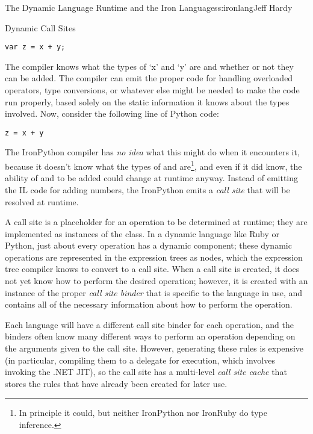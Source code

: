 \begin{aosachapter}{The Dynamic Language Runtime and the Iron Languages}{s:ironlang}{Jeff Hardy}
\begin{aosasect1}{Dynamic Call Sites}
\begin{verbatim}
var z = x + y;
\end{verbatim}

\noindent The compiler knows what the types of `x' and `y' are and whether or not they
can be added. The compiler can emit the proper code for handling overloaded
operators, type conversions, or whatever else might be needed to make the code
run properly, based solely on the static information it knows about the types
involved. Now, consider the following line of Python code:

\begin{verbatim}
z = x + y
\end{verbatim}

The IronPython compiler has \emph{no idea} what this might do when it
encounters it, because it doesn't know what the types of  and 
are\footnote{In principle it could, but neither IronPython nor IronRuby do type
inference.}, and even if it did know, the ability of  and  to be
added could change at runtime anyway. Instead of emitting the IL code for
adding numbers, the IronPython emits a \emph{call site} that will be resolved
at runtime.

A call site is a placeholder for an operation to be determined at runtime; they
are implemented as instances of the
 class. In a dynamic language
like Ruby or Python, just about every operation has a dynamic component; these
dynamic operations are represented in the expression trees as
 nodes, which the expression tree compiler knows to
convert to a call site. When a call site is created, it does not yet know
how to perform the desired operation; however, it is created with an instance
of the proper \emph{call site binder} that is specific to the language in use,
and contains all of the necessary information about how to perform the
operation.


Each language will have a different call site binder for each operation, and
the binders often know many different ways to perform an operation depending on
the arguments given to the call site. However, generating these rules is
expensive (in particular, compiling them to a delegate for execution, which
involves invoking the .NET JIT), so the call site has a multi-level \emph{call
site cache} that stores the rules that have already been created for later use.


\end{aosasect1}
\end{aosachapter}
